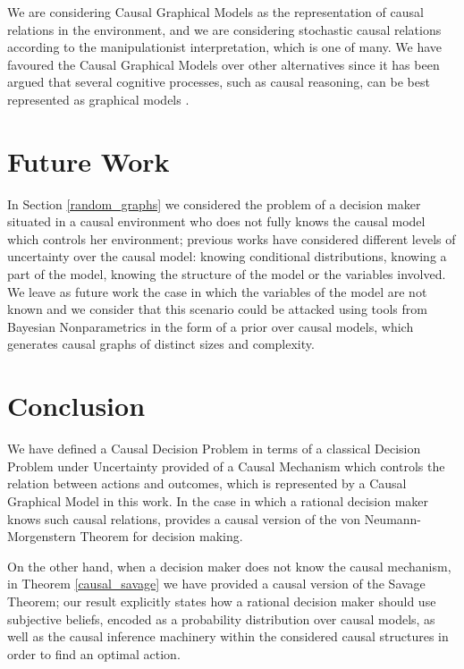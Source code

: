 \documentclass[review]{elsarticle}
\begin{document}
We are considering Causal Graphical Models as the representation of causal relations in the environment, and we are considering stochastic causal relations according to the manipulationist interpretation, which is one of many. We have favoured the Causal Graphical Models over other alternatives since it has been argued that several cognitive processes, such as causal reasoning, can be best represented as graphical models \cite{danks2014unifying,sloman2015causality,hagmayer2016causal}.

\section{Future Work}
In Section \ref{random_graphs} we considered the problem of a decision maker situated in a causal environment who does not fully knows the causal model which controls her environment; previous works have considered different levels of uncertainty over the causal model: knowing conditional distributions, knowing a part of the model, knowing the structure of the model or the variables involved. We leave as future work the case in which the variables of the model are not known and we consider that this scenario could be attacked using tools from Bayesian Nonparametrics \citep{hjort2010bayesian,phadia2013prior} in the form of a prior over causal models, which generates causal graphs of distinct sizes and complexity.

\section{Conclusion}
\label{conclusion}
We have defined a Causal Decision Problem in terms of a classical Decision Problem under Uncertainty provided of a Causal Mechanism which controls the relation between actions and outcomes, which is represented by a Causal Graphical Model in this work. In the case in which a rational decision maker knows such causal relations, \cite{pearl2009causality} provides a causal version of the von Neumann-Morgenstern Theorem for decision making. 

On the other hand, when a decision maker does not know the causal mechanism, in Theorem \ref{causal_savage} we have provided a causal version of the Savage Theorem; our result explicitly states how a rational decision maker should use subjective beliefs, encoded as a probability distribution over causal models, as well as the causal inference machinery within the considered causal structures in order to find an optimal action.
\end{document}
